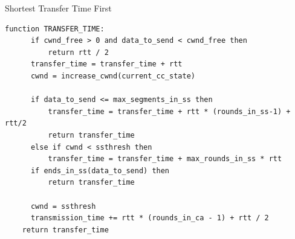 \documentclass{beamer}
\begin{document}
\begin{frame}[fragile]{Shortest Transfer Time First}
  \begin{lstlisting}[frame=single, basicstyle=\tiny, caption={STTF pseudo code,  \textcolor{uos-grey-full}{Source: \cite{lowlatschedulers}}}, label=code::sttf]
  function TRANSFER_TIME:
      if cwnd_free > 0 and data_to_send < cwnd_free then
          return rtt / 2
      transfer_time = transfer_time + rtt
      cwnd = increase_cwnd(current_cc_state)

      if data_to_send <= max_segments_in_ss then
          transfer_time = transfer_time + rtt * (rounds_in_ss-1) + rtt/2
          return transfer_time
      else if cwnd < ssthresh then
          transfer_time = transfer_time + max_rounds_in_ss * rtt
      if ends_in_ss(data_to_send) then
          return transfer_time

      cwnd = ssthresh
      transmission_time += rtt * (rounds_in_ca - 1) + rtt / 2
    return transfer_time
  \end{lstlisting}
\end{frame}
\end{document}
